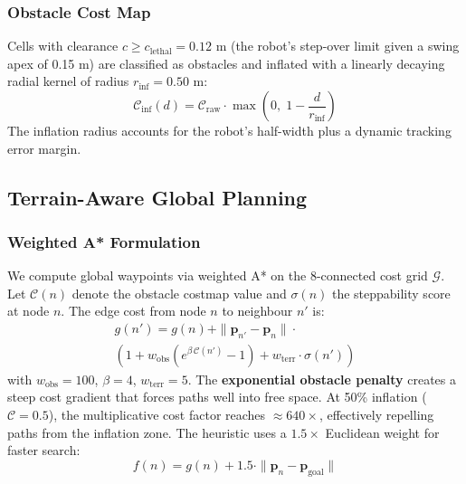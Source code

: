 \documentclass[letterpaper, 10 pt, conference]{ieeeconf}  %
\begin{document}
\subsubsection{Obstacle Cost Map}
Cells with clearance $c \geq c_{\text{lethal}} = 0.12$ m (the robot's step-over limit given a swing apex of 0.15 m) are classified as obstacles and inflated with a linearly decaying radial kernel of radius $r_{\text{inf}} = 0.50$ m:
\begin{equation}
\mathcal{C}_{\text{inf}}(d) = \mathcal{C}_{\text{raw}} \cdot \max\!\left(0,\; 1 - \frac{d}{r_{\text{inf}}}\right) \label{eq:inflation}
\end{equation}
The inflation radius accounts for the robot's half-width plus a dynamic tracking error margin.
\subsection{Terrain-Aware Global Planning}
\label{sec:astar}
\subsubsection{Weighted A* Formulation}
We compute global waypoints via weighted A* on the 8-connected cost grid $\mathcal{G}$. Let $\mathcal{C}(n)$ denote the obstacle costmap value and $\sigma(n)$ the steppability score at node $n$. The edge cost from node $n$ to neighbour $n'$ is:
\begin{multline}
g(n') = g(n) + \|\mathbf{p}_{n'} - \mathbf{p}_n\| \cdot \\
\left(1 + w_{\text{obs}}\!\left(e^{\beta\, \mathcal{C}(n')} - 1\right) + w_{\text{terr}} \cdot \sigma(n')\right) \label{eq:astar_edge}
\end{multline}
with $w_{\text{obs}} = 100$, $\beta = 4$, $w_{\text{terr}} = 5$. The \textbf{exponential obstacle penalty} creates a steep cost gradient that forces paths well into free space. At 50\% inflation ($\mathcal{C} = 0.5$), the multiplicative cost factor reaches $\approx 640\times$, effectively repelling paths from the inflation zone. The heuristic uses a $1.5\times$ Euclidean weight for faster search:
\begin{equation}
f(n) = g(n) + 1.5 \cdot \|\mathbf{p}_n - \mathbf{p}_{\text{goal}}\| \label{eq:heuristic}
\end{equation}
\end{document}
